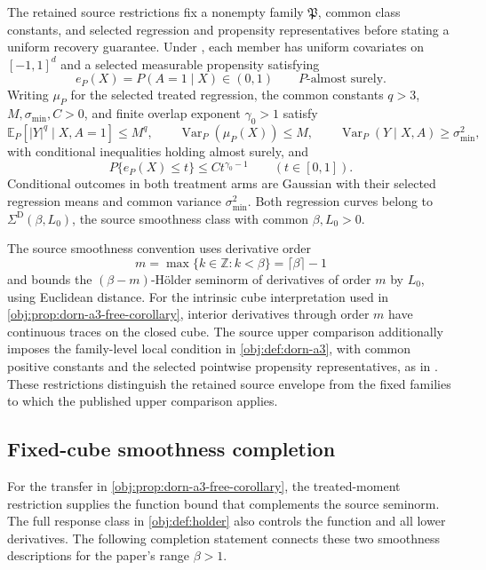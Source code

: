 \documentclass[11pt]{article}
\begin{document}
The retained source restrictions fix a nonempty family \(\mathfrak P\), common class constants, and selected regression and propensity representatives before stating a uniform recovery guarantee. Under \citet[Section 2, Assumptions 1--2, author PDF pp.~3--7]{Dorn2026GlobalOverlap}, each member has uniform covariates on \([-1,1]^d\) and a selected measurable propensity satisfying
\[
e_P(X)=P(A=1\mid X)\in(0,1)
\qquad P\text{-almost surely}.
\]
Writing \(\mu_P\) for the selected treated regression, the common constants \(q>3\), \(M,\sigma_{\min},C>0\), and finite overlap exponent \(\gamma_0>1\) satisfy
\[
\mathbb E_P\!\left[|Y|^q\mid X,A=1\right]\le M^q,
\qquad
\operatorname{Var}_P(\mu_P(X))\le M,
\qquad
\operatorname{Var}_P(Y\mid X,A)\ge\sigma_{\min}^2,
\]
with conditional inequalities holding almost surely, and
\[
P\{e_P(X)\le t\}\le Ct^{\gamma_0-1}
\qquad(t\in[0,1]).
\]
Conditional outcomes in both treatment arms are Gaussian with their selected regression means and common variance \(\sigma_{\min}^2\). Both regression curves belong to \(\Sigma^{\mathrm D}(\beta,L_0)\), the source smoothness class with common \(\beta,L_0>0\).

The source smoothness convention uses derivative order
\[
m=\max\{k\in\mathbb Z:k<\beta\}=\lceil\beta\rceil-1
\]
and bounds the \((\beta-m)\)-Hölder seminorm of derivatives of order \(m\) by \(L_0\), using Euclidean distance. For the intrinsic cube interpretation used in \cref{obj:prop:dorn-a3-free-corollary}, interior derivatives through order \(m\) have continuous traces on the closed cube. The source upper comparison additionally imposes the family-level local condition in \cref{obj:def:dorn-a3}, with common positive constants and the selected pointwise propensity representatives, as in \citet[Section 2, Assumption 3, author PDF pp.~6--7]{Dorn2026GlobalOverlap}. These restrictions distinguish the retained source envelope from the fixed families to which the published upper comparison applies.

\subsection{Fixed-cube smoothness completion}

For the transfer in \cref{obj:prop:dorn-a3-free-corollary}, the treated-moment restriction supplies the function bound that complements the source seminorm. The full response class in \cref{obj:def:holder} also controls the function and all lower derivatives. The following completion statement connects these two smoothness descriptions for the paper's range \(\beta>1\).
\end{document}
